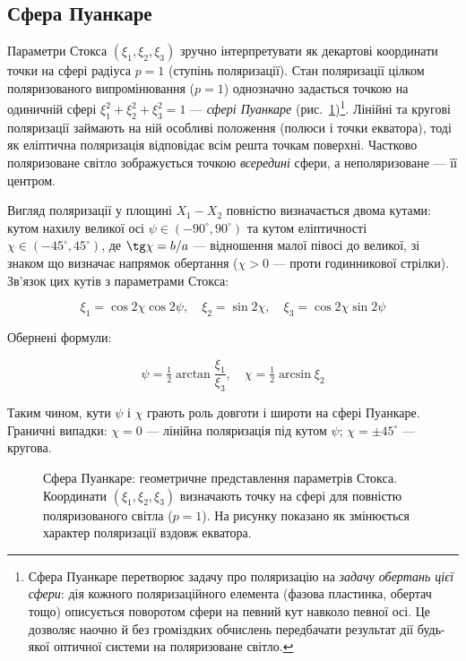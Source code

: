 \subsection*{Сфера Пуанкаре}

Параметри Стокса \((\xi_1, \xi_2, \xi_3)\) зручно інтерпретувати як декартові координати точки на сфері радіуса \(p = 1\) (ступінь поляризації). Стан поляризації цілком поляризованого випромінювання (\(p = 1\)) однозначно задається точкою на одиничній сфері \(\xi_1^2 + \xi_2^2 + \xi_3^2 = 1\) --- \emph{сфері Пуанкаре} (рис.~\ref{pic:Stoke})\footnote{Сфера Пуанкаре перетворює задачу про поляризацію на \emph{задачу обертань цієї сфери}: дія кожного поляризаційного елемента (фазова пластинка, обертач тощо) описується поворотом сфери на певний кут навколо певної осі. Це дозволяє наочно й без громіздких обчислень передбачати результат дії будь-якої оптичної системи на поляризоване світло.}. Лінійні та кругові поляризації займають на ній особливі положення (полюси і точки екватора), тоді як еліптична поляризація відповідає всім решта точкам поверхні. Частково поляризоване світло зображується точкою \emph{всередині} сфери, а неполяризоване --- її центром.


Вигляд поляризації у площині \(X_1\!-\!X_2\) повністю визначається двома кутами: кутом нахилу великої осі \(\psi \in (-90^{\circ}, 90^{\circ})\) та кутом еліптичності \(\chi \in (-45^{\circ}, 45^{\circ})\), де \(\tg\chi = b/a\) --- відношення малої півосі до великої, зі знаком що визначає напрямок обертання (\(\chi > 0\) --- проти годинникової стрілки). Зв'язок цих кутів з параметрами Стокса:

\begin{equation*}
\xi_1 = \cos 2\chi \cos 2\psi, \quad
\xi_2 = \sin 2\chi, \quad
\xi_3 = \cos 2\chi \sin 2\psi
\end{equation*}

Обернені формули:

\begin{equation*}
\psi = \tfrac{1}{2}\arctan\frac{\xi_1}{\xi_3}, \quad
\chi = \tfrac{1}{2}\arcsin\xi_2
\end{equation*}

Таким чином, кути \(\psi\) і \(\chi\) грають роль довготи і широти на сфері Пуанкаре. Граничні випадки: \(\chi = 0\) --- лінійна поляризація під кутом \(\psi\); \(\chi = \pm 45^{\circ}\) --- кругова.


\begin{figure}[ht!]\centering

\caption{Сфера Пуанкаре: геометричне представлення параметрів Стокса. Координати \((\xi_1, \xi_2, \xi_3)\) визначають точку на сфері для повністю поляризованого світла (\(p=1\)). На рисунку показано як змінюється характер поляризації вздовж екватора.}
\label{pic:Stoke}
\end{figure}

